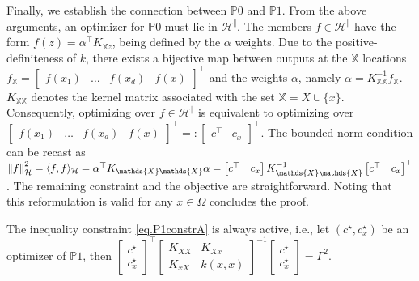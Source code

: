 \begin{my_proof}
	Finally, we establish the connection between $\mathds{P}0$ and $\mathds{P}1$. From the above arguments, an optimizer for $\mathds{P}0$ must lie in $\mathcal{H}^\Vert$. The members $f \in \mathcal{H}^\Vert$ have the form $f(z) = \alpha^\top K_{\mathds{X}z}$, being defined by the $\alpha$ weights. Due to the positive-definiteness of $k$, there exists a bijective map between outputs at the $\mathds{X}$ locations $f_{\mathds{X}} = \begin{bmatrix} f(x_1) & \dots & f(x_d) & f(x) \end{bmatrix}^\top$ and the weights $\alpha$, namely $\alpha = K_{\mathds{X}\mathds{X}}^{-1}f_{\mathds{X}}$. $K_{\mathds{X}\mathds{X}}$ denotes the kernel matrix associated with the set $\mathds{X} = X \cup \{x\}$. Consequently, optimizing over $f \in \mathcal{H}^\Vert$ is equivalent to optimizing over $\begin{bmatrix} f(x_1) & \dots & f(x_d) & f(x) \end{bmatrix}^\top =: \begin{bmatrix}c^\top & c_x\end{bmatrix}^\top$. The bounded norm condition can be recast as $\rknorm{f}^2 = \rkinner{f}{f} = \alpha^\top K_{\mathds{X}\mathds{X}} \alpha = \begin{bmatrix}c^\top & c_x\end{bmatrix} K_{\mathds{X}\mathds{X}}^{-1} \begin{bmatrix}c^\top & c_x\end{bmatrix}^\top$. The remaining constraint and the objective are straightforward. Noting that this reformulation is valid for any $x \in \Omega$ concludes the proof. 
\end{my_proof}

\begin{proposition} 
	\label{prop.complex_constraint_always_active}
	The inequality constraint \eqref{eq.P1constrA} is always active, i.e., let $(c^\star,c_x^\star)$ be an optimizer of $\mathds{P}1$, then $\begin{bmatrix}
		c ^\star\\
		c_x^\star
	\end{bmatrix}^\top 
	\begin{bmatrix}
		K_{XX} & K_{Xx} \\
		K_{xX} & k(x,x)
	\end{bmatrix}^{-1} 
	\begin{bmatrix}
		c^\star \\
		c_x^\star
	\end{bmatrix} = \Gamma^2 $. 
\end{proposition}

